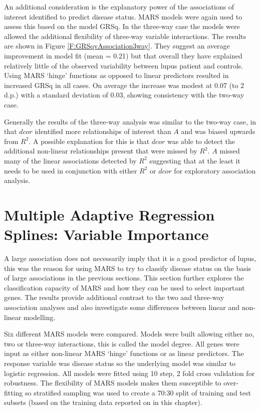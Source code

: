 \documentclass[a4paper, 12pt]{report}
\begin{document}
An additional consideration is the explanatory power of the associations of interest identified to predict disease status. MARS models were again used to assess this based on the model GRSq. In the three-way case the models were allowed the additional flexibility of three-way variable interactions. The results are shown in Figure \ref{F:GRSqvAssociation3way}. They suggest an average improvement in model fit (mean = 0.21) but that overall they have explained relatively little of the observed variability between lupus patient and controls. Using MARS `hinge' functions as opposed to linear predictors resulted in increased GRSq in all cases. On average the increase was modest at 0.07 (to 2 d.p.) with a standard deviation of 0.03, showing consistency with the two-way case.

Generally the results of the three-way analysis was similar to the two-way case, in that $dcor$ identified more relationships of interest than $A$ and was biased upwards from $R^2$. A possible explanation for this is that $dcor$ was able to detect the additional non-linear relationships present that were missed by $R^2$. $A$ missed many of the linear associations detected by $R^2$ suggesting that at the least it needs to be used in conjunction with either $R^2$ or $dcor$ for exploratory association analysis.

\section{Multiple Adaptive Regression Splines: Variable Importance}
A large association does not necessarily imply that it is a good predictor of lupus, this was the reason for using MARS to try to classify disease status on the basis of large associations in the previous sections. This section further explores the classification capacity of MARS and how they can be used to select important genes. The results provide additional contrast to the two and three-way association analyses and also investigate some differences between linear and non-linear modelling.

Six different MARS models were compared. Models were built allowing either no, two or three-way interactions, this is called the model degree. All genes were input as either non-linear MARS `hinge' functions or as linear predictors. The response variable was disease status so the underlying model was similar to logistic regression. All models were fitted using 10 step, 2 fold cross validation for robustness. The flexibility of MARS models makes them susceptible to over-fitting so stratified sampling was used to create a 70:30 split of training and test subsets (based on the training data reported on in this chapter). 
\end{document}
